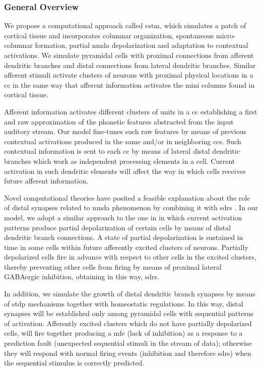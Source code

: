 \documentclass[10pt,letterpaper]{article}
\begin{document}
\subsubsection*{General Overview}

We propose a computational approach called \gls{cstm}, which simulates a patch of cortical tissue and incorporates columnar organization, spontaneous micro-columnar formation, partial \gls{nmda} depolarization and adaptation to contextual activations. We simulate pyramidal cells with proximal connections from afferent dendritic branches and distal connections from lateral dendritic branches. Similar afferent stimuli activate clusters of neurons with proximal physical locations in a \gls{cc} in the same way that afferent information activates the mini columns found in cortical tissue.

Afferent information activates different clusters of units in a \gls{cc} establishing a first and raw approximation of the phonetic features abstracted from the input auditory stream. Our model fine-tunes such raw features by means of previous contextual activations produced in the same and/or in neighboring \glspl{cc}. Such contextual information is sent to each \gls{cc} by means of lateral distal dendritic branches which work as independent processing elements in a cell. Current activation in such dendritic elements will affect the way in which cells receives future afferent information.

Novel computational theories have posited a feasible explanation about the role of distal synapses related to \gls{nmda}
phenomenon \cite{hawkins_2016} by combining it with \glspl{sdr} \cite{ahmad_2016}. In our model, we adopt a similar approach to the one in \cite{hawkins_2016} in which current activation patterns produce partial depolarization of certain cells by means of distal dendritic branch connections. A state of partial depolarization is sustained in time in some cells within
future afferently excited clusters of neurons. Partially depolarized cells fire in advance with respect to other cells in the excited clusters, thereby preventing other cells from firing by means of proximal lateral GABAergic inhibition, obtaining in this way, \glspl{sdr}.

In addition, we simulate the growth of distal dendritic branch synapses by means of \gls{stdp} mechanisms together with
homeostatic regulations. In this way, distal synapses will be established only among pyramidal cells with sequential patterns
of activation. Afferently excited clusters which do not have partially depolarized cells,
will fire together producing a \gls{mfe}
(lack of inhibition) as a response to a prediction fault (unexpected sequential stimuli in the stream of data); otherwise they will respond with normal firing events (inhibition and therefore \glspl{sdr}) when the sequential stimulus is
correctly predicted.
\end{document}
